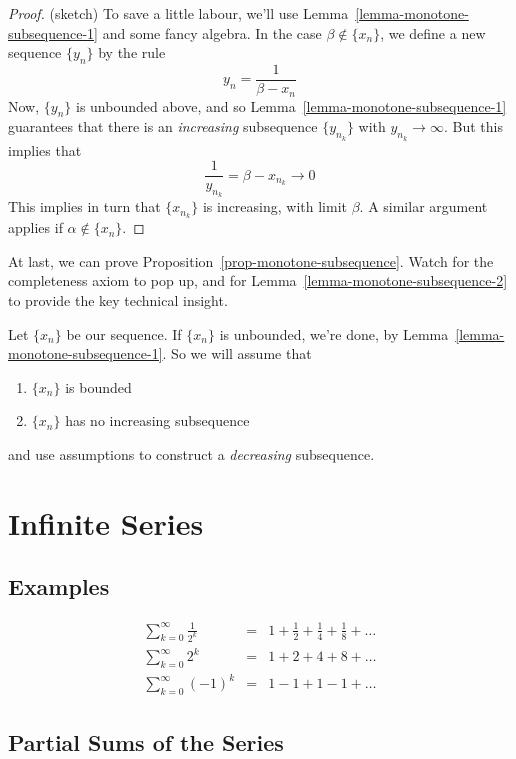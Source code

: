 \documentclass[12pt]{scrbook}
\begin{document}
\begin{proof} (sketch)
To save a little labour, we'll use Lemma~\ref{lemma-monotone-subsequence-1} and some fancy algebra.  In the case 
$\beta \notin \{x_n\}$, we define a new sequence $\{y_n\}$ by the rule
\[ y_n = \frac{1}{\beta - x_n} \]
Now, $\{ y_n \}$ is unbounded above, and so Lemma~\ref{lemma-monotone-subsequence-1} guarantees that there is an {\em increasing} subsequence $\{ y_{n_k} \}$ with $y_{n_k} \rightarrow \infty$.  But this implies that
\[ \frac{1}{y_{n_k}} = \beta - x_{n_k} \rightarrow 0 \]
This implies in turn that $\{ x_{n_k} \}$ is increasing, with limit $\beta$. A similar argument applies if 
$\alpha \notin \{ x_n \}$.
\end{proof}

At last, we can prove Proposition~\ref{prop-monotone-subsequence}.  Watch for the completeness axiom to pop up, and for 
Lemma~\ref{lemma-monotone-subsequence-2} to provide the key technical insight.

Let $\{ x_n \}$ be our sequence.  If $\{ x_n \}$ is unbounded, we're done, by Lemma~\ref{lemma-monotone-subsequence-1}. So
we will assume that
\begin{enumerate}
\item $\{ x_n \}$ is bounded
\item $\{ x_n \}$ has no increasing subsequence
\end{enumerate}
and use assumptions to construct a {\em decreasing} subsequence.


\chapter{Infinite Series}

\section{Examples}

\begin{eqnarray*}
\sum_{k=0}^{\infty} \frac{1}{2^k} 	&=& 1 + \frac{1}{2} + \frac{1}{4} + \frac{1}{8} + \ldots  \\
\sum_{k=0}^{\infty} 2^k			&=& 1 + 2 + 4 + 8 + \ldots  \\
\sum_{k=0}^{\infty} (-1)^k 			&=& 1 - 1 + 1 - 1 + \ldots 
\end{eqnarray*}

\section{Partial Sums of the Series}
\end{document}
